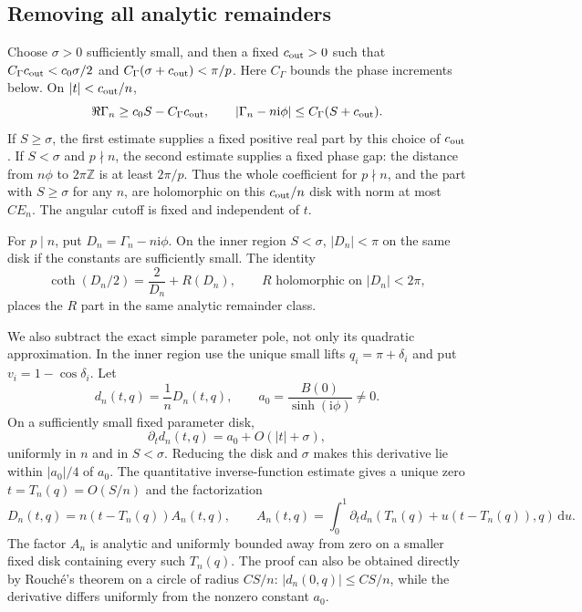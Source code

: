 \documentclass[11pt]{article}
\numberwithin{equation}{section}
\theoremstyle{definition}
\newcommand{\Z}{\mathbb Z}
\newcommand{\dd}{\,\mathrm d}
\newcommand{\ii}{\mathrm i}
\begin{document}
\subsection{Removing all analytic remainders}

Choose $\sigma>0$ sufficiently small, and then a fixed
$c_{\rm out}>0$ such that
$C_\Gamma c_{\rm out}<c_0\sigma/2$ and
$C_\Gamma(\sigma+c_{\rm out})<\pi/p$.
Here $C_\Gamma$ bounds the phase increments below. On
$|t|<c_{\rm out}/n$,
\begin{equation}\label{eq:jets_c_over_n_estimate}
 \Re\Gamma_n\ge c_0S-C_\Gamma c_{\rm out},\qquad
 |\Gamma_n-n\ii\phi|\le C_\Gamma(S+c_{\rm out}).
\end{equation}
If $S\ge\sigma$, the first estimate supplies a fixed positive real
part by this choice of $c_{\rm out}$. If $S<\sigma$ and $p\nmid n$, the
second estimate supplies a fixed phase gap: the distance from
$n\phi$ to $2\pi\Z$ is at least $2\pi/p$. Thus the whole
coefficient for $p\nmid n$, and the part with $S\ge\sigma$ for any
$n$, are holomorphic on this $c_{\rm out}/n$ disk with norm at most $CE_n$.
The angular cutoff is fixed and independent of $t$.

For $p\mid n$, put $D_n=\Gamma_n-n\ii\phi$. On the inner region
$S<\sigma$, $|D_n|<\pi$ on the same disk if the constants are
sufficiently small. The identity
\begin{equation}\label{eq:jets_coth_subtraction}
 \coth(D_n/2)=\frac2{D_n}+R(D_n),
 \qquad R \text{ holomorphic on } |D_n|<2\pi,
\end{equation}
places the $R$ part in the same analytic remainder class.

We also subtract the exact simple parameter pole, not only its
quadratic approximation. In the inner region use the unique small
lifts $q_i=\pi+\delta_i$ and put $v_i=1-\cos\delta_i$. Let
\[
 d_n(t,q)=\frac1nD_n(t,q),\qquad
 a_0=\frac{B(0)}{\sinh(\ii\phi)}\ne0.
\]
On a sufficiently small fixed parameter disk,
\[
 \partial_t d_n(t,q)=a_0+O(|t|+\sigma),
\]
uniformly in $n$ and in $S<\sigma$. Reducing the disk and $\sigma$
makes this derivative lie within $|a_0|/4$ of $a_0$. The quantitative
inverse-function estimate gives a unique zero
$t=T_n(q)=O(S/n)$ and the factorization
\begin{equation}\label{eq:jets_exact_pole_factor}
 D_n(t,q)=n(t-T_n(q))A_n(t,q),\qquad
 A_n(t,q)=\int_0^1\partial_t d_n
       (T_n(q)+u(t-T_n(q)),q)\dd u.
\end{equation}
The factor $A_n$ is analytic and uniformly bounded away from zero on
a smaller fixed disk containing every such $T_n(q)$. The proof can
also be obtained directly by Rouch\'e's theorem on a circle of radius
$CS/n$: $|d_n(0,q)|\le CS/n$, while the derivative differs uniformly
from the nonzero constant $a_0$.
\end{document}
